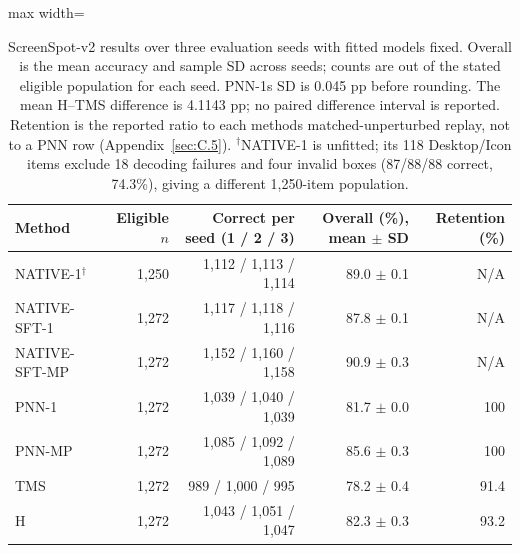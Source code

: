 \begin{table}[!tbp]
\centering
\small
\setlength{\tabcolsep}{4pt}
\renewcommand{\arraystretch}{1.13}
\renewcommand{\thetable}{D.\arabic{table}}
\renewcommand{\theHtable}{D.\arabic{table}}
\setcounter{table}{5}
\begin{adjustbox}{max width=\textwidth}
\begin{tabular}{lrrrr}
\toprule
Method & Eligible $n$ & Correct per seed (1 / 2 / 3) & Overall (\%), mean $\pm$ SD & Retention (\%) \\
\midrule
NATIVE-1$^\dagger$ & 1,250 & 1,112 / 1,113 / 1,114 & 89.0 $\pm$ 0.1 & N/A \\
NATIVE-SFT-1 & 1,272 & 1,117 / 1,118 / 1,116 & 87.8 $\pm$ 0.1 & N/A \\
NATIVE-SFT-MP & 1,272 & 1,152 / 1,160 / 1,158 & 90.9 $\pm$ 0.3 & N/A \\
PNN-1 & 1,272 & 1,039 / 1,040 / 1,039 & 81.7 $\pm$ 0.0 & 100 \\
PNN-MP & 1,272 & 1,085 / 1,092 / 1,089 & 85.6 $\pm$ 0.3 & 100 \\
TMS & 1,272 & 989 / 1,000 / 995 & 78.2 $\pm$ 0.4 & 91.4 \\
H & 1,272 & 1,043 / 1,051 / 1,047 & 82.3 $\pm$ 0.3 & 93.2 \\
\bottomrule
\end{tabular}
\end{adjustbox}
\caption{ScreenSpot-v2 results over three evaluation seeds with fitted models fixed. Overall is the mean accuracy and sample SD across seeds; counts are out of the stated eligible population for each seed. PNN-1\textquotesingle s SD is 0.045 pp before rounding. The mean H--TMS difference is 4.1143 pp; no paired difference interval is reported. Retention is the reported ratio to each method\textquotesingle s matched-unperturbed replay, not to a PNN row (Appendix~\ref{sec:C.5}). $^\dagger$NATIVE-1 is unfitted; its 118 Desktop/Icon items exclude 18 decoding failures and four invalid boxes (87/88/88 correct, 74.3\%), giving a different 1,250-item population.}
\label{tab:D.6}
\end{table}
